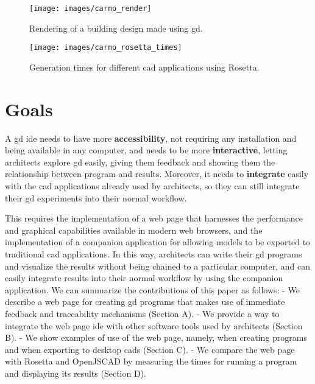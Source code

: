 \begin{figure}
	\centering
	\texttt{[image: images/carmo\_render]}
	\caption{Rendering of a building design made using \gls{gd}.}
	\label{fig:carmo:render}
\end{figure}

\begin{figure}
	\centering
	\texttt{[image: images/carmo\_rosetta\_times]}
	\caption{Generation times for different \gls{cad} applications using Rosetta.}
	\label{fig:carmo:times}
\end{figure}


\section{Goals}
A \gls{gd} \gls{ide} needs to have more \textbf{accessibility}, not requiring any installation and being available in any computer, and needs to be more \textbf{interactive}, letting architects explore \gls{gd} easily, giving them feedback and showing them the relationship between program and results.
Moreover, it needs to \textbf{integrate} easily with the \gls{cad} applications already used by architects, so they can still integrate their \gls{gd} experiments into their normal workflow.

This requires the implementation of a web page that harnesses the performance and graphical capabilities available in modern web browsers, and the implementation of a companion application for allowing models to be exported to traditional \gls{cad} applications.
In this way, architects can write their \gls{gd} programs and visualize the results without being chained to a particular computer, and can easily integrate results into their normal workflow by using the companion application.
We can summarize the contributions of this paper as follows:
- We describe a web page for creating \gls{gd} programs that makes use of immediate feedback and traceability mechanisms (Section A).
- We provide a way to integrate the web page \gls{ide} with other software tools used by architects (Section B).
- We show examples of use of the web page, namely, when creating programs and when exporting to desktop \glspl{cad} (Section C).
- We compare the web page with Rosetta and OpenJSCAD by measuring the times for running a program and displaying its results (Section D).
